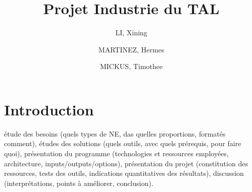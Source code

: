 \documentclass{article}
\title{Projet Industrie du TAL}
\author{LI, Xining \and MARTINEZ, Hermes \and MICKUS, Timothee}
\begin{document}
\maketitle

\clearpage

\section{Introduction}

étude des besoins (quels types de NE, das quelles proportions, formatés comment),
études des solutions (quels outils, avec quels prérequis, pour faire quoi),
présentation du programme (technologies et ressources employées, architecture, inputs/outputs/options),
présentation du projet (constitution des ressources, tests des outils, indications quantitatives des résultats),
discussion (interprétations, points à améliorer, conclusion).
\end{document}
